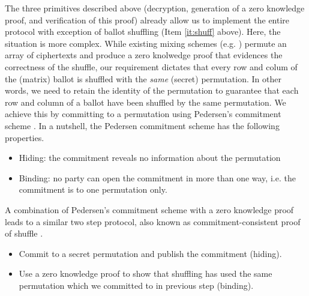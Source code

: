 The three primitives described above (decryption, generation of a
zero knowledge proof, and verification of this proof) already allow
us  to implement the entire protocol with exception of ballot
shuffling (Item \ref{it:shuff} above).  Here, the situation is more
complex. While existing mixing schemes (e.g. \cite{Bayer:2012:EZK}) permute 
an array of ciphertexts and produce a zero knolwedge proof that
evidences the correctness of the shuffle, our requirement dictates
that every row and colum of the (matrix) ballot is
shuffled with the \emph{same} (secret) permutation.  In other words,
we need to retain the identity of the permutation to guarantee that
each row and column of a ballot have been shuffled by the same
permutation.
We achieve this by
committing to a permutation using Pedersen's commitment scheme
\cite{Pederson}.
In a nutshell, the Pedersen commitment scheme has the following properties. 
\begin{itemize}
\item Hiding: the commitment reveals no information about the
permutation
\item Binding: no party can open the commitment in more  
	 	than one way, i.e. the commitment is to one permutation only. 
\end{itemize}

\noindent
A combination of Pedersen's commitment scheme 
with a zero knowledge proof leads to a similar two step protocol, also known 
as commitment-consistent proof of shuffle \cite{Wikstrom:2009:CPS}.

\begin{itemize}
\item Commit to a secret permutation and publish the commitment (hiding).
\item Use a zero knowledge proof to show that shuffling has used 
      the same permutation which we committed to in previous step (binding).
\end{itemize}  

